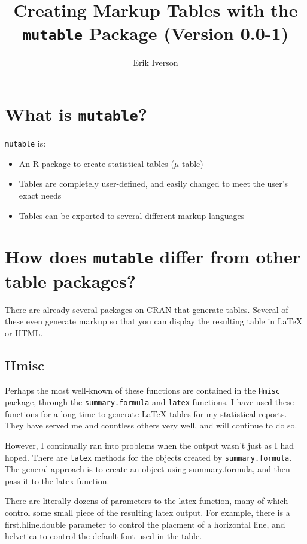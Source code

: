 \documentclass{article}
\begin{document}
\title{Creating Markup Tables with the \texttt{mutable} Package (Version 0.0-1)}

\author{Erik Iverson}
\maketitle

\section{What is \texttt{mutable}?}

\texttt{mutable} is: 
\begin{itemize}
  \item An R package to create statistical tables ($\mu$ table)
  \item Tables are completely user-defined, and easily changed to meet the user's exact needs
  \item Tables can be exported to several different markup languages
\end{itemize}

\section{How does \texttt{mutable} differ from other table packages?}

There are already several packages on CRAN that generate
tables. Several of these even generate markup so that you can
display the resulting table in \LaTeX{} or HTML. 


\subsection{Hmisc}
Perhaps the most well-known of these functions are contained in the
\texttt{Hmisc} package, through the \texttt{summary.formula} and
\texttt{latex} functions.  I have used these functions for a long time
to generate \LaTeX{} tables for my statistical reports.  They have
served me and countless others very well, and will continue to do so.

However, I continually ran into problems when the output wasn't just
as I had hoped. There are \texttt{latex} methods for the objects
created by \texttt{summary.formula}.  The general approach is to
create an object using summary.formula, and then pass it to the latex
function. 

There are literally dozens of parameters to the latex function, many
of which control some small piece of the resulting latex output.  For
example, there is a first.hline.double parameter to control the
placment of a horizontal line, and helvetica to control the default
font used in the table. 
\end{document}
